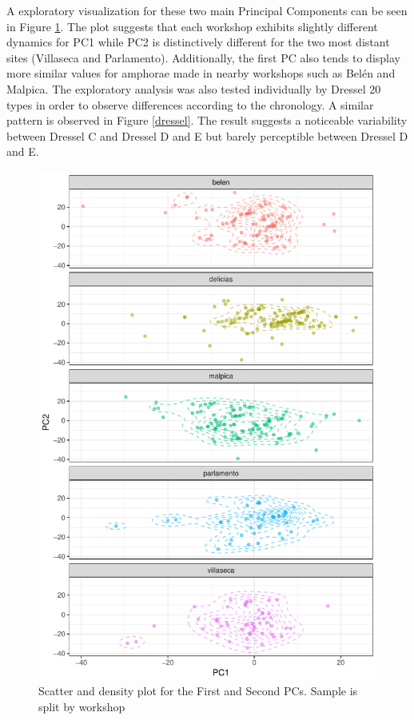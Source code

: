 \documentclass[review]{elsarticle}
\begin{document}
A exploratory visualization for these two main Principal Components can be seen in Figure \ref{pca}. The plot suggests that each workshop exhibits slightly different dynamics for PC1 while PC2 is distinctively different for the two most distant sites (Villaseca and Parlamento). Additionally, the first PC also tends to display more similar values for amphorae made in nearby workshops such as Bel\'en and Malpica. The exploratory analysis was also tested individually by Dressel 20 types in order to observe differences according to the chronology. A similar pattern is observed in Figure \ref{dressel}. The result suggests  a noticeable variability between Dressel C and Dressel D and E but barely perceptible between Dressel D and E.

\begin{figure}[htp]
	\centering
\includegraphics[width=\linewidth]{figs/pca}
\caption{Scatter and density plot for the First and Second PCs. Sample is split by workshop}
\label{pca}
\end{figure} 
\end{document}
